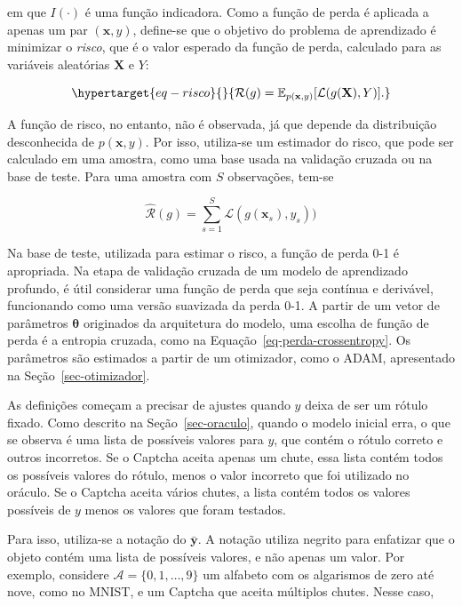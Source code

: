 \documentclass[12pt,twoside,brazilian]{book}
\begin{document}
em que \(I(\cdot)\) é uma função indicadora. Como a função de perda é
aplicada a apenas um par \((\mathbf x,y)\), define-se que o objetivo do
problema de aprendizado é minimizar o \emph{risco}, que é o valor
esperado da função de perda, calculado para as variáveis aleatórias
\(\mathbf X\) e \(Y\):

\begin{equation}\protect\hypertarget{eq-risco}{}{
\mathcal R(g) = \mathbb E_{p(\mathbf x,y)}[\mathcal L(g(\mathbf X),Y)].
}\label{eq-risco}\end{equation}

A função de risco, no entanto, não é observada, já que depende da
distribuição desconhecida de \(p(\mathbf x,y)\). Por isso, utiliza-se um
estimador do risco, que pode ser calculado em uma amostra, como uma base
usada na validação cruzada ou na base de teste. Para uma amostra com
\(S\) observações, tem-se

\[
\hat{\mathcal R}(g) = \sum_{s=1}^S \mathcal L(g(\mathbf x_s),y_s))
\]

Na base de teste, utilizada para estimar o risco, a função de perda 0-1
é apropriada. Na etapa de validação cruzada de um modelo de aprendizado
profundo, é útil considerar uma função de perda que seja contínua e
derivável, funcionando como uma versão suavizada da perda 0-1. A partir
de um vetor de parâmetros \(\boldsymbol \theta\) originados da
arquitetura do modelo, uma escolha de função de perda é a entropia
cruzada, como na Equação~\ref{eq-perda-crossentropy}. Os parâmetros são
estimados a partir de um otimizador, como o ADAM, apresentado na
Seção~\ref{sec-otimizador}.

As definições começam a precisar de ajustes quando \(y\) deixa de ser um
rótulo fixado. Como descrito na Seção~\ref{sec-oraculo}, quando o modelo
inicial erra, o que se observa é uma lista de possíveis valores para
\(y\), que contém o rótulo correto e outros incorretos. Se o Captcha
aceita apenas um chute, essa lista contém todos os possíveis valores do
rótulo, menos o valor incorreto que foi utilizado no oráculo. Se o
Captcha aceita vários chutes, a lista contém todos os valores possíveis
de \(y\) menos os valores que foram testados.

Para isso, utiliza-se a notação do \(\bar {\mathbf y}\). A notação
utiliza negrito para enfatizar que o objeto contém uma lista de
possíveis valores, e não apenas um valor. Por exemplo, considere
\(\mathcal A = \{0,1,\dots,9\}\) um alfabeto com os algarismos de zero
até nove, como no MNIST, e um Captcha que aceita múltiplos chutes. Nesse
caso,
\end{document}

